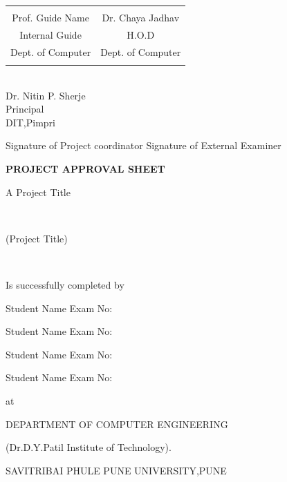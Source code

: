 \documentclass[oneside,a4paper,12pt]{report}
\begin{document}
\bgroup
\def\arraystretch{0.9}
\begin{tabular}{c c }
\newline
\\Prof. Guide Name &  \hspace{50 mm} Dr. Chaya Jadhav\\								
Internal Guide   &  \hspace{50 mm} H.O.D \\
Dept. of Computer  &	\hspace{50 mm}Dept. of Computer  \\ \newline
\end{tabular}
\begin{center}
{
\\ \newline Dr. Nitin P. Sherje \\
Principal\\
DIT,Pimpri 
}

\end{center}
 \newline
Signature of Project coordinator \hspace{30 mm} Signature of External Examiner
\newpage
\begin{center}
\textbf{PROJECT APPROVAL SHEET}
\end{center}
\begin{center}
 A Project Title
 \end{center} \\
\begin{center}
(Project Title)
\end{center}\\
\begin{center}
Is successfully completed by 
\end{center}
\centerline{Student Name  \hspace{25 mm} Exam No: } 
\centerline{Student Name \hspace{25 mm} Exam No:  } 
\centerline{Student Name \hspace{25 mm} Exam No: }
\centerline{Student Name \hspace{25 mm} Exam No: }
\begin{center}
 at
 \end{center} 
 \begin{center}
 DEPARTMENT OF COMPUTER ENGINEERING
 \end{center}
 \begin{center}
 (Dr.D.Y.Patil Institute of Technology).
 \end{center}
 \begin{center}
 SAVITRIBAI PHULE PUNE UNIVERSITY,PUNE
 \end{center}
 
\end{document}
